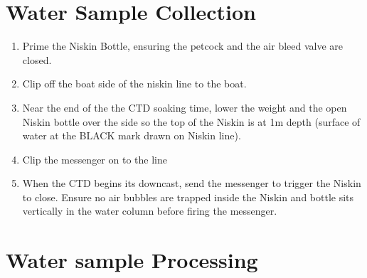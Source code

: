 \documentclass[]{book}
\providecommand{\tightlist}{%
  \setlength{\itemsep}{0pt}\setlength{\parskip}{0pt}}
\begin{document}
\hypertarget{water-sample-collection}{%
\section{Water Sample Collection}\label{water-sample-collection}}

\begin{enumerate}
\def\labelenumi{\arabic{enumi}.}
\tightlist
\item
  Prime the Niskin Bottle, ensuring the petcock and the air bleed valve are closed.
\item
  Clip off the boat side of the niskin line to the boat.
\item
  Near the end of the the CTD soaking time, lower the weight and the open Niskin bottle over the side so the top of the Niskin is at 1m depth (surface of water at the BLACK mark drawn on Niskin line).
\item
  Clip the messenger on to the line
\item
  When the CTD begins its downcast, send the messenger to trigger the Niskin to close. Ensure no air bubbles are trapped inside the Niskin and bottle sits vertically in the water column before firing the messenger.
\end{enumerate}

\hypertarget{water-sample-processing}{%
\section{Water sample Processing}\label{water-sample-processing}}
\end{document}

